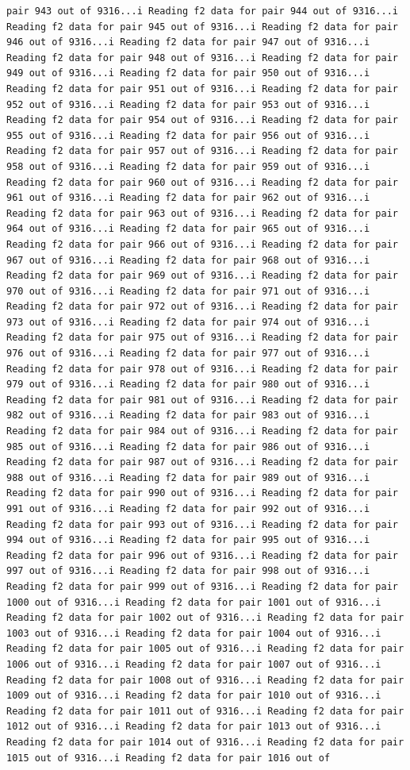 \documentclass[
]{article}
\begin{document}
\begin{verbatim}
pair 943 out of 9316...i Reading f2 data for pair 944 out of 9316...i Reading f2 data for pair 945 out of 9316...i Reading f2 data for pair 946 out of 9316...i Reading f2 data for pair 947 out of 9316...i Reading f2 data for pair 948 out of 9316...i Reading f2 data for pair 949 out of 9316...i Reading f2 data for pair 950 out of 9316...i Reading f2 data for pair 951 out of 9316...i Reading f2 data for pair 952 out of 9316...i Reading f2 data for pair 953 out of 9316...i Reading f2 data for pair 954 out of 9316...i Reading f2 data for pair 955 out of 9316...i Reading f2 data for pair 956 out of 9316...i Reading f2 data for pair 957 out of 9316...i Reading f2 data for pair 958 out of 9316...i Reading f2 data for pair 959 out of 9316...i Reading f2 data for pair 960 out of 9316...i Reading f2 data for pair 961 out of 9316...i Reading f2 data for pair 962 out of 9316...i Reading f2 data for pair 963 out of 9316...i Reading f2 data for pair 964 out of 9316...i Reading f2 data for pair 965 out of 9316...i Reading f2 data for pair 966 out of 9316...i Reading f2 data for pair 967 out of 9316...i Reading f2 data for pair 968 out of 9316...i Reading f2 data for pair 969 out of 9316...i Reading f2 data for pair 970 out of 9316...i Reading f2 data for pair 971 out of 9316...i Reading f2 data for pair 972 out of 9316...i Reading f2 data for pair 973 out of 9316...i Reading f2 data for pair 974 out of 9316...i Reading f2 data for pair 975 out of 9316...i Reading f2 data for pair 976 out of 9316...i Reading f2 data for pair 977 out of 9316...i Reading f2 data for pair 978 out of 9316...i Reading f2 data for pair 979 out of 9316...i Reading f2 data for pair 980 out of 9316...i Reading f2 data for pair 981 out of 9316...i Reading f2 data for pair 982 out of 9316...i Reading f2 data for pair 983 out of 9316...i Reading f2 data for pair 984 out of 9316...i Reading f2 data for pair 985 out of 9316...i Reading f2 data for pair 986 out of 9316...i Reading f2 data for pair 987 out of 9316...i Reading f2 data for pair 988 out of 9316...i Reading f2 data for pair 989 out of 9316...i Reading f2 data for pair 990 out of 9316...i Reading f2 data for pair 991 out of 9316...i Reading f2 data for pair 992 out of 9316...i Reading f2 data for pair 993 out of 9316...i Reading f2 data for pair 994 out of 9316...i Reading f2 data for pair 995 out of 9316...i Reading f2 data for pair 996 out of 9316...i Reading f2 data for pair 997 out of 9316...i Reading f2 data for pair 998 out of 9316...i Reading f2 data for pair 999 out of 9316...i Reading f2 data for pair 1000 out of 9316...i Reading f2 data for pair 1001 out of 9316...i Reading f2 data for pair 1002 out of 9316...i Reading f2 data for pair 1003 out of 9316...i Reading f2 data for pair 1004 out of 9316...i Reading f2 data for pair 1005 out of 9316...i Reading f2 data for pair 1006 out of 9316...i Reading f2 data for pair 1007 out of 9316...i Reading f2 data for pair 1008 out of 9316...i Reading f2 data for pair 1009 out of 9316...i Reading f2 data for pair 1010 out of 9316...i Reading f2 data for pair 1011 out of 9316...i Reading f2 data for pair 1012 out of 9316...i Reading f2 data for pair 1013 out of 9316...i Reading f2 data for pair 1014 out of 9316...i Reading f2 data for pair 1015 out of 9316...i Reading f2 data for pair 1016 out of 
\end{verbatim}
\end{document}

